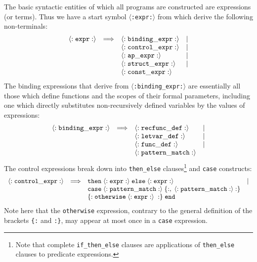 The basic syntactic entities of which all \kir programs are
constructed  are {\mys expressions} (or {\mys terms}). Thus we have a start symbol
{\tt $\langle$:expr:$\rangle$} from which derive the following 
 non-terminals:
$$
\begin{array}{rclc}
{\tt \langle:expr:\rangle} &\Longrightarrow & {\tt \langle:binding\_expr:\rangle} & |\\
& & {\tt \langle:control\_expr:\rangle} & |\\
& & {\tt \langle:ap\_expr:\rangle} & |\\
& & {\tt \langle:struct\_expr:\rangle} & |\\
& & {\tt \langle:const\_expr:\rangle} &
\end{array}
$$
The {\mys binding expressions} that derive from {\tt $\langle$:binding\_expr:$\rangle$} are essentially all those which define functions and the
scopes of their formal parameters, including one which directly substitutes non-recursively defined variables by the values of expressions:
$$
\begin{array}{rclc}
{\tt \langle:binding\_expr:\rangle} & \Longrightarrow & {\tt \langle:recfunc\_def:\rangle} & |\\
& & {\tt \langle:letvar\_def:\rangle} & |\\
& & {\tt\langle:func\_def:\rangle} & |\\
& & {\tt\langle:pattern\_match:\rangle} & 
\end{array}
$$
The {\mys control expressions} break down into {\tt then\_else}
clauses\footnote{Note that complete {\tt if\_then\_else} clauses are
{\mys applications} of 
 {\tt then\_else} clauses to predicate expressions.} and {\tt case}
constructs:
$$
\begin{array}{rclc}
{\tt \langle:control\_expr:\rangle} & \Longrightarrow & {\tt then\;\langle:expr:\rangle\;else\;\langle:expr:\rangle} & |\\
& & {\tt case\;\langle:pattern\_match:\rangle\;\{:,\;\langle:pattern\_match:\rangle:\}} &\\
& & {\tt \{:otherwise\;\langle:expr:\rangle\;:\}\;end}
\end{array}
$$ 
Note here that the {\tt otherwise} expression, contrary to the general
definition of the brackets {\tt \{:} and {\tt :\}}, may appear at most
once in a {\tt case} expression.


